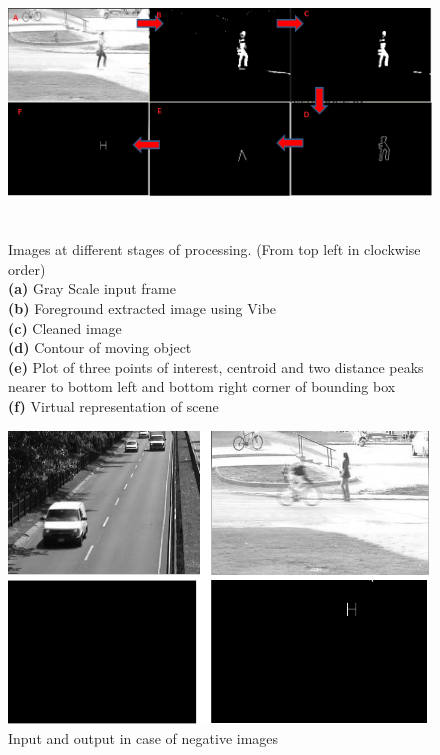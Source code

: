 \begin{figure}[!t]
\centering
\includegraphics[height=200pt]{Figures/pipeline_images}
\caption{Images at different stages of processing. (From top left in
 clockwise order)\\
 \textbf{(a)} Gray Scale input frame\\
 \textbf{(b)} Foreground extracted image using Vibe\\
 \textbf{(c)} Cleaned image\\
 \textbf{(d)} Contour of moving object\\
 \textbf{(e)} Plot of three points of interest, centroid and two distance
peaks nearer to bottom left and bottom right corner of bounding box\\
\textbf{(f)} Virtual representation of scene} 
\label{pipeline_images}
\end{figure}
\begin{figure}[!b]
\centering
\includegraphics[height=220pt]{Figures/negative_inputs}
\caption{Input and output in case of negative images}
\label{negative_inputs}
\end{figure}

